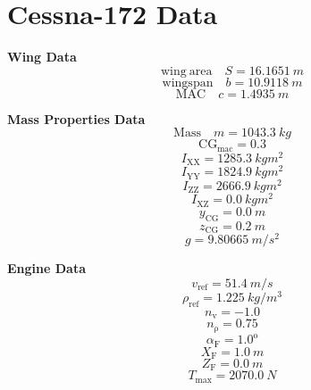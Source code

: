 \documentclass{article}
\begin{document}
\twocolumn
\section{Cessna-172 Data}

\centering

\vfill\null
\textbf{Wing Data}
\begin{equation}
\mathrm{wing\ area} \quad S = 16.1651\ m
\end{equation}
\begin{equation}
\mathrm{wing span} \quad b = 10.9118\ m
\end{equation}
\begin{equation}
\mathrm{MAC} \quad c = 1.4935\ m
\end{equation}

\textbf{Mass Properties Data}
\begin{equation}
\mathrm{Mass} \quad m = 1043.3\ kg
\end{equation}
\begin{equation}
\mathrm{CG}_{\mathrm{mac}} = 0.3
\end{equation}
\begin{equation}
I_{\mathrm{XX}} = 1285.3\ kgm^2
\end{equation}
\begin{equation}
I_{\mathrm{YY}} = 1824.9\ kgm^2
\end{equation}
\begin{equation}
I_{\mathrm{ZZ}} = 2666.9\ kgm^2
\end{equation}
\begin{equation}
I_{\mathrm{XZ}} = 0.0\ kgm^2
\end{equation}
\begin{equation}
y_{\mathrm{CG}} = 0.0\ m
\end{equation}
\begin{equation}
z_{\mathrm{CG}} = 0.2\ m
\end{equation}
\begin{equation}
g = 9.80665\ m/s^2
\end{equation}

\vfill\null
\textbf{Engine Data}
\begin{equation}
v_{\mathrm{ref}} = 51.4\ m/s
\end{equation}
\begin{equation}
\rho_{\mathrm{ref}} = 1.225\ kg/m^3
\end{equation}
\begin{equation}
n_{\mathrm{v}} = -1.0
\end{equation}
\begin{equation}
n_{\mathrm{\rho}} = 0.75
\end{equation}
\begin{equation}
\alpha_{\mathrm{F}} = 1.0^{\mathrm{o}}
\end{equation}
\begin{equation}
X_{\mathrm{F}} = 1.0\ m
\end{equation}
\begin{equation}
Z_{\mathrm{F}} = 0.0\ m
\end{equation}
\begin{equation}
T_{\mathrm{max}} = 2070.0\ N
\end{equation}
\end{document}
